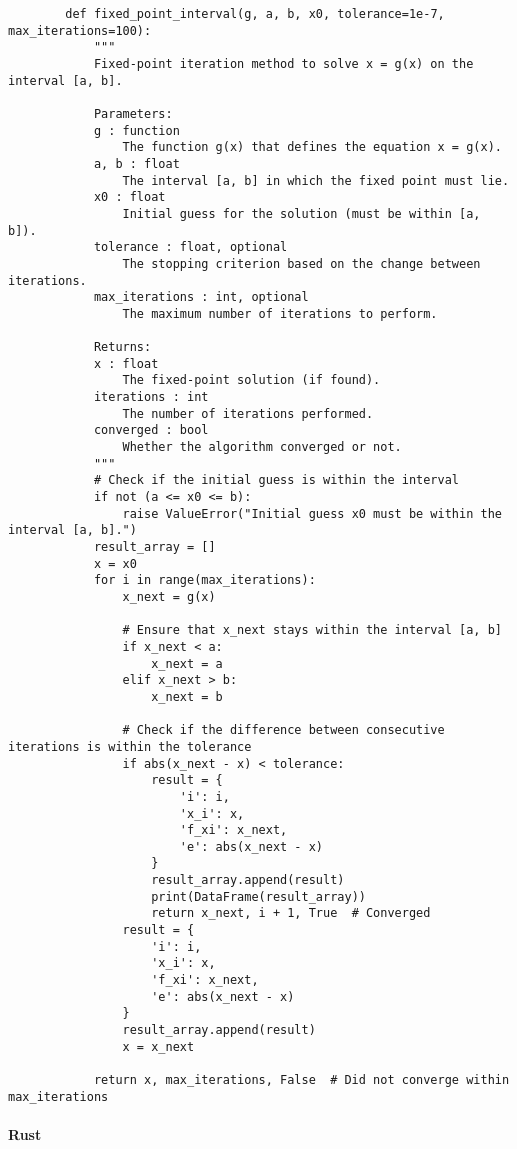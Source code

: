\documentclass{article}
\begin{document}
    \begin{verbatim}
        def fixed_point_interval(g, a, b, x0, tolerance=1e-7, max_iterations=100):
            """
            Fixed-point iteration method to solve x = g(x) on the interval [a, b].

            Parameters:
            g : function
                The function g(x) that defines the equation x = g(x).
            a, b : float
                The interval [a, b] in which the fixed point must lie.
            x0 : float
                Initial guess for the solution (must be within [a, b]).
            tolerance : float, optional
                The stopping criterion based on the change between iterations.
            max_iterations : int, optional
                The maximum number of iterations to perform.

            Returns:
            x : float
                The fixed-point solution (if found).
            iterations : int
                The number of iterations performed.
            converged : bool
                Whether the algorithm converged or not.
            """
            # Check if the initial guess is within the interval
            if not (a <= x0 <= b):
                raise ValueError("Initial guess x0 must be within the interval [a, b].")
            result_array = []
            x = x0
            for i in range(max_iterations):
                x_next = g(x)

                # Ensure that x_next stays within the interval [a, b]
                if x_next < a:
                    x_next = a
                elif x_next > b:
                    x_next = b

                # Check if the difference between consecutive iterations is within the tolerance
                if abs(x_next - x) < tolerance:
                    result = {
                        'i': i,
                        'x_i': x,
                        'f_xi': x_next,
                        'e': abs(x_next - x)
                    }
                    result_array.append(result)
                    print(DataFrame(result_array))
                    return x_next, i + 1, True  # Converged
                result = {
                    'i': i,
                    'x_i': x,
                    'f_xi': x_next,
                    'e': abs(x_next - x)
                }
                result_array.append(result)
                x = x_next

            return x, max_iterations, False  # Did not converge within max_iterations
    \end{verbatim}
    \paragraph{Rust}
    \begin{verbatim}

    \end{verbatim}
\end{document}
